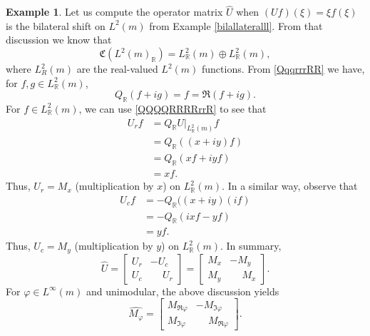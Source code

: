 \documentclass{dis}
\newcommand{\phm}{\phantom{-}}
\theoremstyle{plain}
\theoremstyle{definition}
\newtheorem{Example}[equation]{Example}
\def\R{\mathbb{R}}
\renewcommand{\phi}{\varphi}
\newcommand{\0}{{\color{lightgray}0}}
\begin{document}
\begin{Example}\label{sdkfsdfkkW}
Let us compute the operator matrix $\widehat{U}$ when $(U f)(\xi) = \xi f(\xi)$ is the bilateral shift on $L^2(m)$ from Example \ref{bilallateralll}. From that discussion we know that
$$\mathfrak{C}(L^2(m)_{\R}) = L^{2}_{\R}(m) \oplus L^{2}_{\R}(m),$$
where $L^{2}_{R}(m)$ are the real-valued $L^2(m)$ functions.
From \eqref{QqqrrrRR} we have, for $f, g \in L^2_{\R}(m)$, 
$$Q_{\R} (f + i g) = f = \Re (f + i g).$$
For $f \in L^{2}_{\R}(m)$, we can use  \eqref{QQQQRRRRrrR} to see that 
\begin{align*}
U_{r} f & = Q_{\R} U|_{L^{2}_{\R}(m)} f\\
& =  Q_{\R} ((x + i y) f) \\
&= Q_{\R} (x f + i y f)\\
& = x f. 
\end{align*}
Thus, $U_{r} = M_{x}$ (multiplication by $x$) on $L^{2}_{\R}(m)$. In a similar way, observe that
\begin{align*}
U_{c} f  & = - Q_{\R} ((x + i y) (if)\\
&  = - Q_{\R} (ix f - y f)\\
&= y f.
\end{align*}
Thus, $U_{c} = M_{y}$ (multiplication by $y$) on $L^{2}_{\R}(m)$. In summary,
$$\widehat{U} = \begin{bmatrix} U_{r} & - U_{c}\\ U_{c} & \phm U_{r}\end{bmatrix} = \begin{bmatrix} M_{x} & - M_{y}\\ M_{y} & \phm M_{x}\end{bmatrix}.$$ For $\phi \in L^{\infty}(m)$ and  unimodular, the above discussion yields 
$$\widehat{M_{\phi}} = \begin{bmatrix} M_{\Re \phi} & - M_{\Im \phi}\\ M_{\Im \phi} & \phantom{-}M_{\Re \phi}\end{bmatrix}.$$ 
\end{Example}
\end{document}
